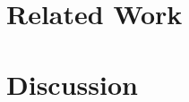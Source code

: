 \documentclass[11pt,a4paper]{article}
\newcommand{\mpTodo}[1]{\Todo[MP:]{\textcolor{green}{#1}}}
\begin{document}
\section{Related Work \label{sec:related}}

\section{Discussion \label{sec:discussion}}
\mpTodo{discussion}



\end{document}
